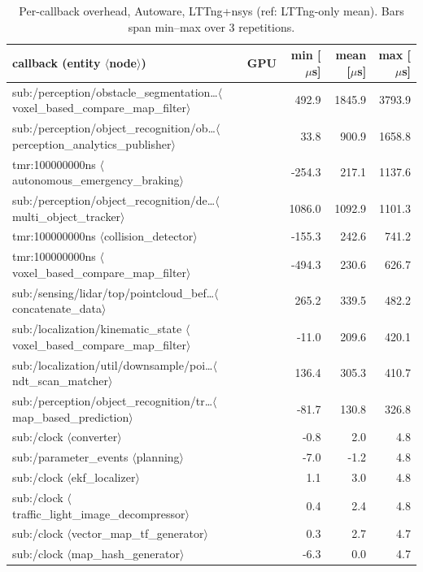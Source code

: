 \begin{table}[t]\centering\scriptsize
\caption{Per-callback overhead, Autoware, LTTng+nsys (ref: LTTng-only mean). Bars span min--max over 3 repetitions.}\label{tab:cbov-aw-nsys}
\begin{tabular}{llrrr}
\toprule
callback (entity $\langle$node$\rangle$) & GPU & min [$\mu$s] & mean [$\mu$s] & max [$\mu$s] \\
\midrule
sub:/perception/obstacle\_segmentation\dots $\langle$voxel\_based\_compare\_map\_filter$\rangle$ &  & 492.9 & 1845.9 & 3793.9 \\
sub:/perception/object\_recognition/ob\dots $\langle$perception\_analytics\_publisher$\rangle$ &  & 33.8 & 900.9 & 1658.8 \\
tmr:100000000ns $\langle$autonomous\_emergency\_braking$\rangle$ &  & -254.3 & 217.1 & 1137.6 \\
sub:/perception/object\_recognition/de\dots $\langle$multi\_object\_tracker$\rangle$ &  & 1086.0 & 1092.9 & 1101.3 \\
tmr:100000000ns $\langle$collision\_detector$\rangle$ &  & -155.3 & 242.6 & 741.2 \\
tmr:100000000ns $\langle$voxel\_based\_compare\_map\_filter$\rangle$ &  & -494.3 & 230.6 & 626.7 \\
sub:/sensing/lidar/top/pointcloud\_bef\dots $\langle$concatenate\_data$\rangle$ &  & 265.2 & 339.5 & 482.2 \\
sub:/localization/kinematic\_state $\langle$voxel\_based\_compare\_map\_filter$\rangle$ &  & -11.0 & 209.6 & 420.1 \\
sub:/localization/util/downsample/poi\dots $\langle$ndt\_scan\_matcher$\rangle$ &  & 136.4 & 305.3 & 410.7 \\
sub:/perception/object\_recognition/tr\dots $\langle$map\_based\_prediction$\rangle$ &  & -81.7 & 130.8 & 326.8 \\
\midrule
sub:/clock $\langle$converter$\rangle$ &  & -0.8 & 2.0 & 4.8 \\
sub:/parameter\_events $\langle$planning$\rangle$ &  & -7.0 & -1.2 & 4.8 \\
sub:/clock $\langle$ekf\_localizer$\rangle$ &  & 1.1 & 3.0 & 4.8 \\
sub:/clock $\langle$traffic\_light\_image\_decompressor$\rangle$ &  & 0.4 & 2.4 & 4.8 \\
sub:/clock $\langle$vector\_map\_tf\_generator$\rangle$ &  & 0.3 & 2.7 & 4.7 \\
sub:/clock $\langle$map\_hash\_generator$\rangle$ &  & -6.3 & 0.0 & 4.7 \\

\end{tabular}
\end{table}
